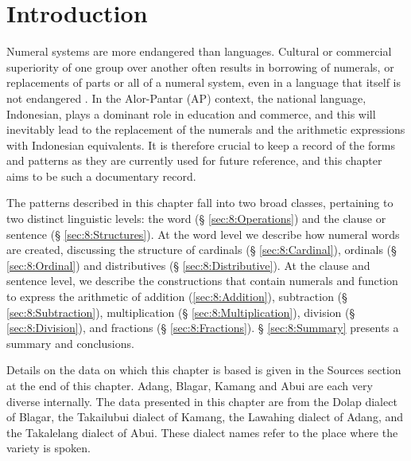 
\section{Introduction}
\label{sec:8:Introduction}
\hypertarget{Toc376958929}{}Numeral systems are more endangered than languages. Cultural or commercial superiority of one group over another often results in borrowing of numerals, or replacements of parts or all of a numeral system, even in a language that itself is not endangered \citep{Comrie2005numsys}. In the Alor-Pantar (AP) context, the national language, Indonesian, plays a dominant role in education and commerce, and this will inevitably lead to the replacement of the numerals and the arithmetic expressions with Indonesian equivalents. It is therefore crucial to keep a record of the forms and patterns as they are currently used for future reference, and this chapter aims to be such a documentary record. 


The patterns described in this chapter fall into two broad classes, pertaining to two distinct linguistic levels: the word ({\S} \ref{sec:8:Operations}) and the clause or sentence ({\S} \ref{sec:8:Structures}). At the word level we describe how numeral words are created, discussing the structure of cardinals ({\S} \ref{sec:8:Cardinal}), ordinals ({\S} \ref{sec:8:Ordinal}) and distributives ({\S} \ref{sec:8:Distributive}). At the clause and sentence level, we describe the constructions that contain numerals and function to express the arithmetic of addition (\ref{sec:8:Addition}), subtraction ({\S} \ref{sec:8:Subtraction}), multiplication ({\S} \ref{sec:8:Multiplication}), division ({\S} \ref{sec:8:Division}), and fractions ({\S} \ref{sec:8:Fractions}). {\S} \ref{sec:8:Summary} presents a summary and conclusions. 

Details on the data on which this chapter is based is given in the  Sources section at the end of this chapter. Adang, Blagar, Kamang and Abui are each very diverse internally. The data presented in this chapter are from the Dolap dialect of Blagar, the Takailubui dialect of Kamang, the Lawahing dialect of Adang, and the Takalelang dialect of Abui. These dialect names refer to the place where the variety is spoken.


